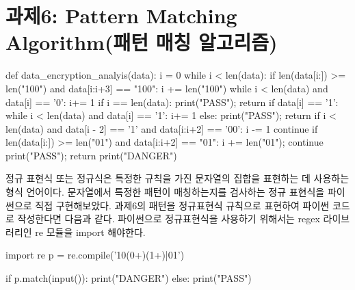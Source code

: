 \documentclass{article}
\begin{document}
\section{과제6: Pattern Matching Algorithm(패턴 매칭 알고리즘)}
\begin{python}
	def data_encryption_analyis(data):
		i = 0
		while i < len(data):
			if len(data[i:]) >= len("100") and data[i:i+3] == "100":
				i += len("100")
				while i < len(data) and data[i] == '0': i+= 1
				if i == len(data): print("PASS"); return
				if data[i] == '1': 
					while i < len(data) and data[i] == '1': i+= 1
				else: print("PASS"); return
				if i < len(data) and data[i - 2] == '1' 
										and data[i:i+2] == '00': i -= 1
				continue
			if len(data[i:]) >= len("01") and data[i:i+2] == "01":
				i += len("01"); continue
			print("PASS"); return
		print("DANGER")
\end{python}
정규 표현식 또는 정규식은 특정한 규칙을 가진 문자열의 집합을 표현하는 데 사용하는 형식 언어이다.
문자열에서 특정한 패턴이 매칭하는지를 검사하는 정규 표현식을 파이썬으로 직접 구현해보았다.
과제6의 패턴을 정규표현식 규칙으로 표현하여 파이썬 코드로 작성한다면 다음과 같다. 파이썬으로
정규표현식을 사용하기 위해서는 regex 라이브러리인 re 모듈을 import 해야한다.

\begin{python}
	import re
	p = re.compile('10(0+)(1+)|01')

	if p.match(input()): print("DANGER")
	else: print("PASS")
\end{python}
\end{document}

